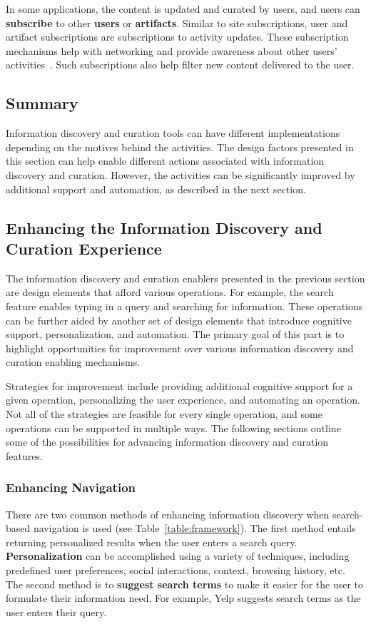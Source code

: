 \documentclass{sigchi}
\begin{document}
{{{In some applications, the content is updated and curated by users, and users can \textbf{subscribe} to other \textbf{users} or \textbf{artifacts}. Similar to site subscriptions, user and artifact subscriptions are subscriptions to activity updates. These subscription mechanisms help with networking and provide awareness about other users' activities~\cite{millen2005social}. Such subscriptions also help filter new content delivered to the user. 
} %
} %

{\subsection{Summary}
Information discovery and curation tools can have different implementations depending on the motives behind the activities. The design factors presented in this section can help enable different actions associated with information discovery and curation. However, the activities can be significantly improved by additional support and automation, as described in the next section.

} %

{\subsection{Enhancing the Information Discovery and Curation Experience}


The information discovery and curation enablers presented in the previous section are design elements that afford various operations. For example, the search feature enables typing in a query and searching for information. These operations can be further aided by another set of design elements that introduce cognitive support, personalization, and automation. The primary goal of this part is to highlight opportunities for improvement over various information discovery and curation enabling mechanisms.

Strategies for improvement include providing additional cognitive support for a given operation, personalizing the user experience, and automating an operation. Not all of the strategies are feasible for every single operation, and some operations can be supported in multiple ways. The following sections outline some of the possibilities for advancing information discovery and curation features. 

{\subsubsection{Enhancing Navigation}
There are two common methods of enhancing information discovery when search-based navigation is used (see Table~\ref{table:framework}). The first method entails returning personalized results when the user enters a search query. \textbf{Personalization} can be accomplished using a variety of techniques, including predefined user preferences, social interactions, context, browsing history, etc. The second method is to \textbf{suggest search terms} to make it easier for the user to formulate their information need. For example, Yelp suggests search terms as the user enters their query.

}}}
\end{document}
